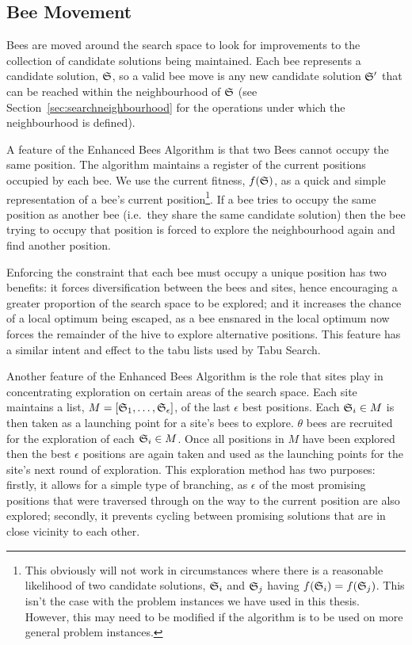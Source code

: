\subsection{Bee Movement}
\label{sec:beemovement}

Bees are moved around the search space to look for improvements to the collection of candidate solutions being maintained. Each bee represents a candidate solution, $\mathfrak{S}$, so a valid bee move is any new candidate solution $\mathfrak{S}'$ that can be reached within the neighbourhood of $\mathfrak{S}$ (see Section~\ref{sec:searchneighbourhood} for the operations under which the neighbourhood is defined).


A feature of the Enhanced Bees Algorithm is that two Bees cannot occupy the same position. The algorithm maintains a register of the current positions occupied by each bee. We use the current fitness, $f(\mathfrak{S})$, as a quick and simple representation of a bee's current position\footnote{This obviously will not work in circumstances where there is a reasonable likelihood of two candidate solutions, $\mathfrak{S}_i$ and $\mathfrak{S}_j$ having $f(\mathfrak{S}_i) = f(\mathfrak{S}_j)$. This isn't the case with the problem instances we have used in this thesis. However, this may need to be modified if the algorithm is to be used on more general problem instances.}. If a bee tries to occupy the same position as another bee (i.e.~they share the same candidate solution) then the bee trying to occupy that position is forced to explore the neighbourhood again and find another position. 

Enforcing the constraint that each bee must occupy a unique position has two benefits: it forces diversification between the bees and sites, hence encouraging a greater proportion of the search space to be explored; and it increases the chance of a local optimum being escaped, as a bee ensnared in the local optimum now forces the remainder of the hive to explore alternative positions. This feature has a similar intent and effect to the tabu lists used by Tabu Search.

Another feature of the Enhanced Bees Algorithm is the role that sites play in concentrating exploration on certain areas of the search space. Each site maintains a list, $M = [\mathfrak{S}_1,\ldots, \mathfrak{S}_\epsilon]$, of the last $\epsilon$ best positions. Each $\mathfrak{S}_i \in M$ is then taken as a launching point for a site's bees to explore. $\theta$ bees are recruited for the exploration of each $\mathfrak{S}_i \in M$. Once all positions in $M$ have been explored then the best $\epsilon$ positions are again taken and used as the launching points for the site's next round of exploration. This exploration method has two purposes: firstly, it allows for a simple type of branching, as $\epsilon$ of the most promising positions that were traversed through on the way to the current position are also explored; secondly, it prevents cycling between promising solutions that are in close vicinity to each other.

